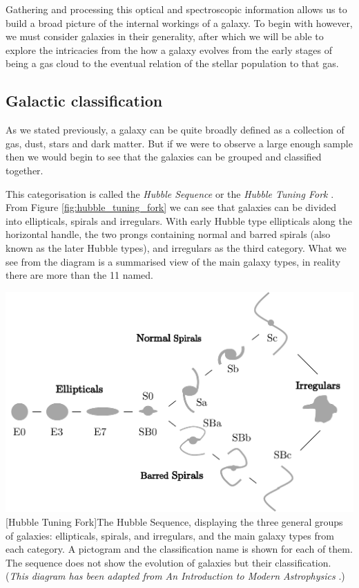 \documentclass[12pt, onecolumn]{revtex4}    %
\begin{document}
Gathering and processing this optical and spectroscopic information allows us to build a broad picture of the internal workings of a galaxy. To begin with however, we must consider galaxies in their generality, after which we will be able to explore the intricacies from the how a galaxy evolves from the early stages of being a gas cloud to the eventual relation of the stellar population to that gas.

\subsection{Galactic classification}

As we stated previously, a galaxy can be quite broadly defined as a collection of gas, dust, stars and dark matter. But if we were to observe a large enough sample then we would begin to see that the galaxies can be grouped and classified together.

This categorisation is called the \textit{Hubble Sequence} or the \textit{Hubble Tuning Fork} \cite{carroll_astro}. From Figure \ref{fig:hubble_tuning_fork} we can see that galaxies can be divided into ellipticals, spirals and irregulars. With early Hubble type ellipticals along the horizontal handle, the two prongs containing normal and barred spirals (also known as the later Hubble types), and irregulars as the third category. What we see from the diagram is a summarised view of the main galaxy types, in reality there are more than the 11 named. 


\begin{center}
\includegraphics[width=0.5\linewidth]{introduction/hubble_tuning_fork}
[Hubble Tuning Fork]{The Hubble Sequence, displaying the three general groups of galaxies: ellipticals, spirals, and irregulars, and the main galaxy types from each category. A pictogram and the classification name is shown for each of them. The sequence does not show the evolution of galaxies but their classification. \\ (\textit{This diagram has been adapted from An Introduction to Modern Astrophysics} \cite{carroll_astro}.)}
\label{fig:hubble_tuning_fork}
\end{center}
\end{document}
